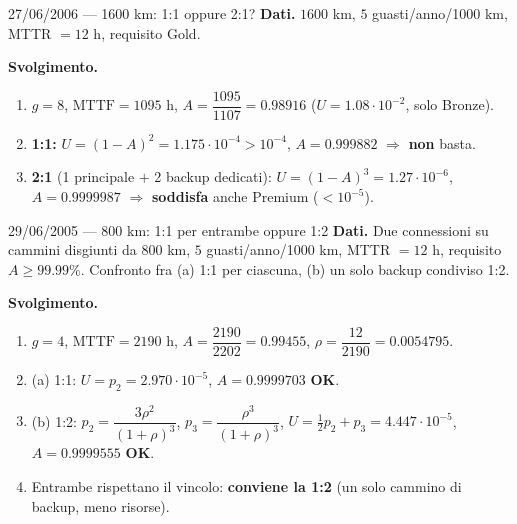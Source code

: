 \begin{esempio}{27/06/2006 --- 1600 km: 1:1 oppure 2:1?}
\textbf{Dati.} $1600$ km, $5$ guasti/anno/1000 km, MTTR $=12$ h, requisito Gold.

\textbf{Svolgimento.}
\begin{enumerate}[leftmargin=*,nosep]
\item $g=8$, $\mathrm{MTTF}=1095$ h, $A=\dfrac{1095}{1107}=0.98916$ ($U=1.08\cdot10^{-2}$, solo Bronze).
\item \textbf{1:1:} $U=(1-A)^2=1.175\cdot10^{-4}>10^{-4}$, $A=0.999882$ $\Rightarrow$ \textbf{non} basta.
\item \textbf{2:1} (1 principale $+$ 2 backup dedicati): $U=(1-A)^3=1.27\cdot10^{-6}$, $A=0.9999987$ $\Rightarrow$ \textbf{soddisfa} anche Premium ($<10^{-5}$).
\end{enumerate}
\end{esempio}

\begin{esempio}{29/06/2005 --- 800 km: 1:1 per entrambe oppure 1:2}
\textbf{Dati.} Due connessioni su cammini disgiunti da $800$ km, $5$ guasti/anno/1000 km, MTTR $=12$ h, requisito $A\ge99.99\%$. Confronto fra (a) 1:1 per ciascuna, (b) un solo backup condiviso 1:2.

\textbf{Svolgimento.}
\begin{enumerate}[leftmargin=*,nosep]
\item $g=4$, $\mathrm{MTTF}=2190$ h, $A=\dfrac{2190}{2202}=0.99455$, $\rho=\dfrac{12}{2190}=0.0054795$.
\item (a) 1:1: $U=p_2=2.970\cdot10^{-5}$, $A=0.9999703$ \textbf{OK}.
\item (b) 1:2: $p_2=\dfrac{3\rho^2}{(1+\rho)^3}$, $p_3=\dfrac{\rho^3}{(1+\rho)^3}$, $U=\tfrac12p_2+p_3=4.447\cdot10^{-5}$, $A=0.9999555$ \textbf{OK}.
\item Entrambe rispettano il vincolo: \textbf{conviene la 1:2} (un solo cammino di backup, meno risorse).
\end{enumerate}
\end{esempio}

